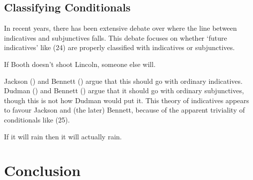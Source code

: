 \documentclass[
  11pt,
  letterpaper,
  DIV=11,
  numbers=noendperiod,
  twoside]{scrartcl}
\providecommand{\tightlist}{%
  \setlength{\itemsep}{0pt}\setlength{\parskip}{0pt}}\usepackage{longtable,booktabs,array}
\begin{document}
\subsection{Classifying Conditionals}\label{classifying-conditionals}

In recent years, there has been extensive debate over where the line
between indicatives and subjunctives falls. This debate focuses on
whether `future indicatives' like (24) are properly classified with
indicatives or subjunctives.

\begin{description}
\tightlist
\item[(24)]
If Booth doesn't shoot Lincoln, someone else will.
\end{description}

Jackson () and Bennett
() argue that this should go with
ordinary indicatives. Dudman () and
Bennett () argue that it should go with
ordinary subjunctives, though this is not how Dudman would put it. This
theory of indicatives appears to favour Jackson and (the later) Bennett,
because of the apparent triviality of conditionals like (25).

\begin{description}
\tightlist
\item[(25)]
If it will rain then it will actually rain.
\end{description}

\section{Conclusion}\label{conclusion}
\end{document}
